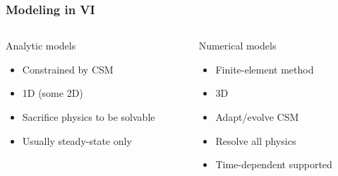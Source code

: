 \begin{frame}
  \frametitle{Modeling in VI}
\begin{columns}[T]
  \begin{column}{0.5\textwidth}
    \begin{block}{Analytic models}
      \begin{itemize}
        \item Constrained by CSM
        \item 1D (some 2D)
        \item Sacrifice physics to be solvable
        \item Usually steady-state only
      \end{itemize}
    \end{block}
  \end{column}
  \begin{column}{0.5\textwidth}
    \begin{block}{Numerical models}
      \begin{itemize}
        \item Finite-element method
        \item 3D
        \item Adapt/evolve CSM
        \item Resolve all physics
        \item Time-dependent supported
      \end{itemize}
    \end{block}
  \end{column}
\end{columns}


\end{frame}
